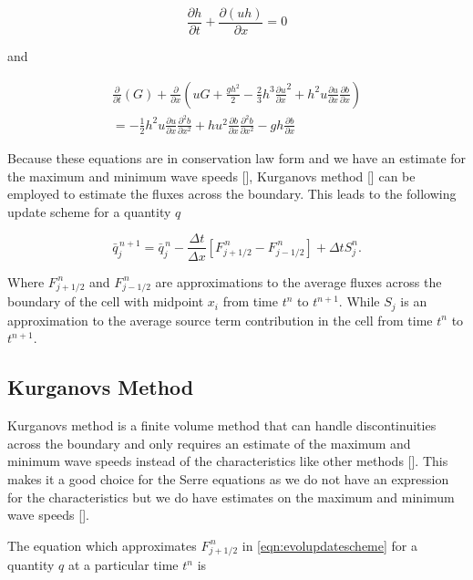 \begin{equation*}
\frac{\partial h}{\partial t} + \dfrac{\partial (uh)}{\partial x} = 0
\end{equation*}

and

\begin{multline*}
\frac{\partial}{\partial t} \left( G \right)  + \frac{\partial}{\partial x} \left( {u} G + \frac{gh^2}{2} - \frac{2}{3}h^3 \frac{\partial {u}}{\partial x}^2 + h^2 {u}\frac{\partial {u}}{\partial x}\frac{\partial b}{\partial x} \right) \\ = -\frac{1}{2}h^2 {u} \frac{\partial {u}}{\partial x} \frac{\partial^2 b}{\partial x^2}  + h {u}^2\frac{\partial b}{\partial x}\frac{\partial^2 b}{\partial x^2} - gh\frac{\partial b}{\partial x} 
\end{multline*}

Because these equations are in conservation law form and we have an estimate for the maximum and minimum wave speeds [], Kurganovs method [] can be employed to estimate the fluxes across the boundary. This leads to the following update scheme for a quantity $q$

\begin{equation}
\label{eqn:evolupdatescheme}
\bar{q}^{\,n + 1}_{j} = \bar{q}^{\,n}_{j} - \frac{\Delta t}{\Delta x} \left[F^{\,n} _{j+1/2} - F^{\,n} _{j-1/2} \right] + \Delta t S_{j}^n.
\end{equation}

Where $F^{\,n} _{j+1/2}$ and $F^{\,n} _{j-1/2}$ are approximations to the average fluxes across the boundary of the cell with midpoint $x_i$ from time $t^n$ to $t^{n+1}$. While $S_{j}$ is an approximation to the average source term contribution in the cell from time $t^n$ to $t^{n+1}$. 

\subsection{Kurganovs Method}

Kurganovs method is a finite volume method that can handle discontinuities across the boundary and only requires an estimate of the maximum and minimum wave speeds instead of the characteristics like other methods []. This makes it a good choice for the Serre equations as we do not have an expression for the characteristics but we do have estimates on the maximum and minimum wave speeds []. 

The equation which approximates $F^{\,n} _{j+1/2}$ in \eqref{eqn:evolupdatescheme} for a quantity $q$ at a particular time $t^n$ is

